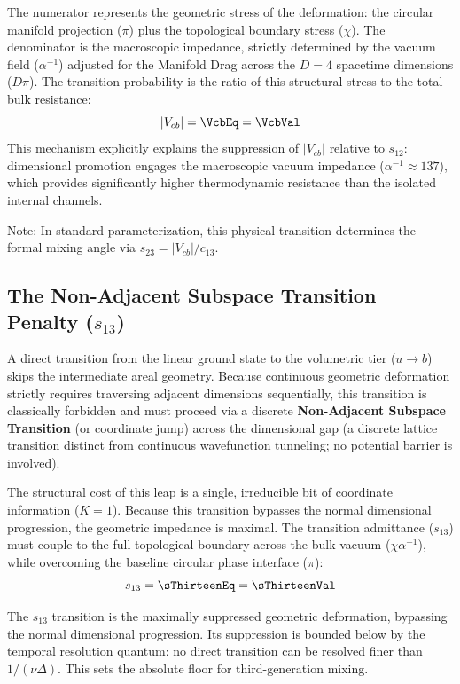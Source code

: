 The numerator represents the geometric stress of the deformation: the circular manifold projection ($\pi$) plus the topological boundary stress ($\chi$). The denominator is the macroscopic impedance, strictly determined by the vacuum field ($\alpha^{-1}$) adjusted for the Manifold Drag across the $D=4$ spacetime dimensions ($D\pi$). The transition probability is the ratio of this structural stress to the total bulk resistance:
\begin{equation}
    |V_{cb}| = \VcbEq = \VcbVal
\end{equation}
This mechanism explicitly explains the suppression of $|V_{cb}|$ relative to $s_{12}$: dimensional promotion engages the macroscopic vacuum impedance ($\alpha^{-1} \approx 137$), which provides significantly higher thermodynamic resistance than the isolated internal channels. \VcbAccText

Note: In standard parameterization, this physical transition determines the formal mixing angle via $s_{23} = |V_{cb}| / c_{13}$.


\subsection{The Non-Adjacent Subspace Transition Penalty (\texorpdfstring{$s_{13}$}{s13})}
A direct transition from the linear ground state to the volumetric tier ($u \to b$) skips the intermediate areal geometry. Because continuous geometric deformation strictly requires traversing adjacent dimensions sequentially, this transition is classically forbidden and must proceed via a discrete \textbf{Non-Adjacent Subspace Transition} (or coordinate jump) across the dimensional gap (a discrete lattice transition distinct from continuous wavefunction tunneling; no potential barrier is involved).

The structural cost of this leap is a single, irreducible bit of coordinate information ($K = 1$). Because this transition bypasses the normal dimensional progression, the geometric impedance is maximal. The transition admittance ($s_{13}$) must couple to the full topological boundary across the bulk vacuum ($\chi\alpha^{-1}$), while overcoming the baseline circular phase interface ($\pi$):
\begin{equation}
    s_{13} = \sThirteenEq = \sThirteenVal
\end{equation}

The $s_{13}$ transition is the maximally suppressed geometric deformation, bypassing the normal dimensional progression. Its suppression is bounded below by the temporal resolution quantum: no direct transition can be resolved finer than $1/(\nu \Delta)$. This sets the absolute floor for third-generation mixing.

